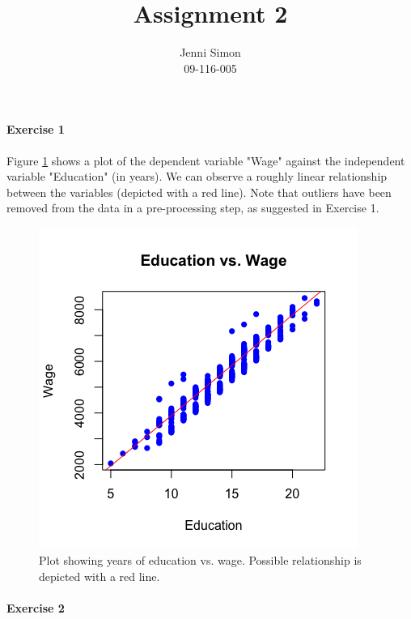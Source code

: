 \documentclass{paper}
\title{Assignment 2}
\author{Jenni Simon\\09-116-005}
\begin{document}
\maketitle


%



\paragraph{Exercise 1}

Figure \ref{fig:EduWage} shows a plot of the dependent variable "Wage" against the independent variable "Education" (in years). We can observe a roughly linear relationship between the variables (depicted with a red line). Note that outliers have been removed from the data in a pre-processing step, as suggested in Exercise 1.
\begin{figure}[h]
\begin{center}
\quad\quad   \includegraphics[width=.7\linewidth]{EduWage}
\end{center}
\caption{Plot showing years of education vs. wage. Possible relationship is depicted with a red line.}
\label{fig:EduWage}
\end{figure}


\paragraph{Exercise 2}
\end{document}
